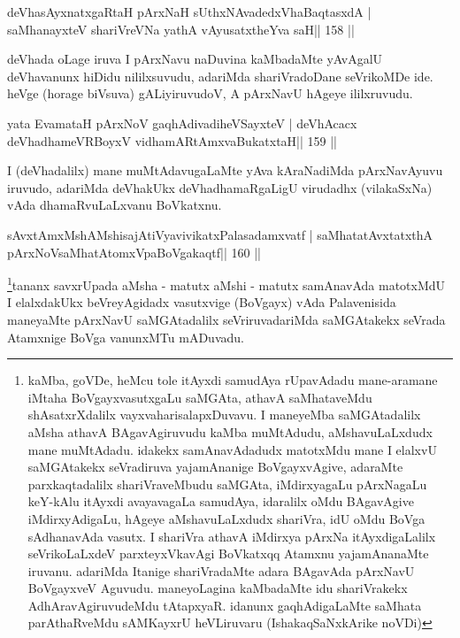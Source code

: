 
\begin{shl}
deVhasAyxnatxgaRtaH pArxNaH sUthxNAvadedxVhaBaqtasxdA |
saMhanayxteV shariVreVNa yathA vAyusatxtheYva saH\hfill || 158 ||
\end{shl}

\begin{artha}
deVhada oLage iruva I pArxNavu naDuvina kaMbadaMte yAvAgalU deVhavanunx  hiDidu nililxsuvudu, adariMda shariVradoDane seVrikoMDe ide. heVge (horage biVsuva) gALiyiruvudoV, A pArxNavU hAgeye ililxruvudu.
\end{artha}

\begin{shl}
yata EvamataH pArxNoV gaqhAdivadiheVSayxteV |
deVhAcacx deVhadhameVRBoyxV vidhamARtAmx\s vaBukatxtaH\hfill || 159 ||
\end{shl}

\begin{artha}
I (deVhadalilx) mane muMtAdavugaLaMte yAva kAraNadiMda pArxNavAyuvu iruvudo, adariMda deVhakUkx deVhadhamaRgaLigU virudadhx (vilakaSxNa) vAda dhamaRvuLaLxvanu BoVkatxnu.
\end{artha}


\begin{shl}
sAvxtAmxMshAMshisajAtiVyavivikatxPalasadamxvatf |
saMhatatAvxtatxthA pArxNoV\s saMhatAtomxVpaBoVgakaqtf\hfill || 160 ||
\end{shl}

\begin{artha}
\footnote[8]{kaMba, goVDe, heMcu tole itAyxdi samudAya rUpavAdadu 
mane-aramane iMtaha BoVgayxvasutxgaLu saMGAta, athavA saMhataveMdu 
shAsatxrXdalilx vayxvaharisalapxDuvavu. I maneyeMba saMGAtadalilx aMsha 
athavA BAgavAgiruvudu kaMba muMtAdudu, aMshavuLaLxdudx mane muMtAdadu. 
idakekx samAnavAdadudx matotxMdu mane I elalxvU saMGAtakekx seVradiruva 
yajamAnanige BoVgayxvAgive, adaraMte parxkaqtadalilx shariVraveMbudu 
saMGAta, iMdirxyagaLu pArxNagaLu keY-kAlu itAyxdi avayavagaLa samudAya, 
idaralilx oMdu BAgavAgive iMdirxyAdigaLu, hAgeye aMshavuLaLxdudx 
shariVra, idU oMdu BoVga sAdhanavAda vasutx. I shariVra athavA iMdirxya 
pArxNa itAyxdigaLalilx seVrikoLaLxdeV parxteyxVkavAgi BoVkatxqq Atamxnu yajamAnanaMte iruvanu. adariMda Itanige shariVradaMte adara BAgavAda pArxNavU BoVgayxveV Aguvudu. maneyoLagina kaMbadaMte idu shariVrakekx AdhAravAgiruvudeMdu tAtapxyaR. idanunx gaqhAdigaLaMte saMhata parAthaRveMdu sAMKayxrU heVLiruvaru (IshakaqSaNxkArike noVDi)}tananx savxrUpada aMsha - matutx aMshi - matutx samAnavAda matotxMdU I elalxdakUkx beVreyAgidadx vasutxvige (BoVgayx) vAda Palavenisida maneyaMte \-pArxNavU saMGAtadalilx seVriruvadariMda saMGAtakekx seVrada Atamxnige BoVga\-	vanunxMTu mADuvadu.
\end{artha}

